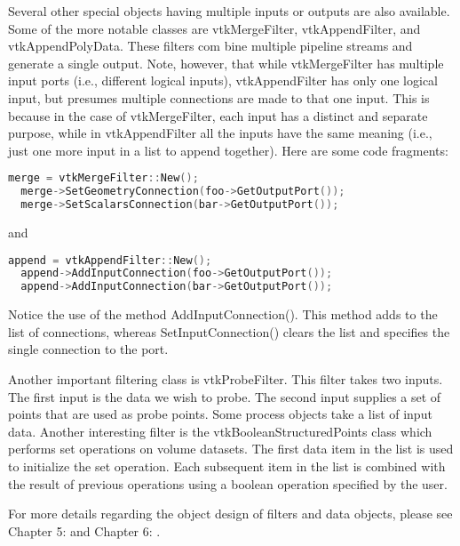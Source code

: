 Several other special objects having multiple inputs or outputs are also available. Some of the more notable classes are vtkMergeFilter, vtkAppendFilter, and vtkAppendPolyData. These filters com bine multiple pipeline streams and generate a single output. Note, however, that while vtkMergeFilter has multiple input ports (i.e., different logical inputs), vtkAppendFilter has only one logical input, but presumes multiple connections are made to that one input. This is because in the case of vtkMergeFilter, each input has a distinct and separate purpose, while in vtkAppendFilter all the inputs have the same meaning (i.e., just one more input in a list to append together). Here are some code fragments:

\begin{lstlisting}[language=C++, caption={}, numbers=none, frame=none]
merge = vtkMergeFilter::New();
  merge->SetGeometryConnection(foo->GetOutputPort());
  merge->SetScalarsConnection(bar->GetOutputPort());
\end{lstlisting}

and

\begin{lstlisting}[language=C++, caption={}, numbers=none, frame=none]
append = vtkAppendFilter::New();
  append->AddInputConnection(foo->GetOutputPort());
  append->AddInputConnection(bar->GetOutputPort());
\end{lstlisting}

Notice the use of the method AddInputConnection(). This method adds to the list of connections, whereas SetInputConnection() clears the list and specifies the single connection to the port.

Another important filtering class is vtkProbeFilter. This filter takes two inputs. The first input is the data we wish to probe. The second input supplies a set of points that are used as probe points. Some process objects take a list of input data. Another interesting filter is the vtkBooleanStructuredPoints class which performs set operations on volume datasets. The first data item in the list is used to initialize the set operation. Each subsequent item in the list is combined with the result of previous operations using a boolean operation specified by the user.

For more details regarding the object design of filters and data objects, please see Chapter 5:  and Chapter 6: .

